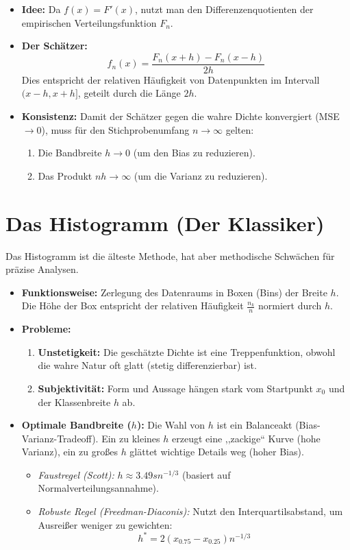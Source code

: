\documentclass[a4paper, 11pt]{scrartcl}
\begin{document}
\begin{itemize}
	\item \textbf{Idee:} Da $f(x) = F'(x)$, nutzt man den Differenzenquotienten der empirischen Verteilungsfunktion $F_n$.
	\item \textbf{Der Schätzer:}
	      \begin{equation}
	      	f_n(x) = \frac{F_n(x+h) - F_n(x-h)}{2h}
	      \end{equation}
	      Dies entspricht der relativen Häufigkeit von Datenpunkten im Intervall $(x-h, x+h]$, geteilt durch die Länge $2h$.
	\item \textbf{Konsistenz:} Damit der Schätzer gegen die wahre Dichte konvergiert (MSE $\to 0$), muss für den Stichprobenumfang $n \to \infty$ gelten:
	      \begin{enumerate}
	      	\item Die Bandbreite $h \to 0$ (um den Bias zu reduzieren).
	      	\item Das Produkt $nh \to \infty$ (um die Varianz zu reduzieren).
	      \end{enumerate}
\end{itemize}
	
\section{Das Histogramm (Der Klassiker)}
Das Histogramm ist die älteste Methode, hat aber methodische Schwächen für präzise Analysen.
	
\begin{itemize}
	\item \textbf{Funktionsweise:} Zerlegung des Datenraums in Boxen (Bins) der Breite $h$. Die Höhe der Box entspricht der relativen Häufigkeit $\frac{n_k}{n}$ normiert durch $h$.
	\item \textbf{Probleme:}
	      \begin{enumerate}
	      	\item \textbf{Unstetigkeit:} Die geschätzte Dichte ist eine Treppenfunktion, obwohl die wahre Natur oft glatt (stetig differenzierbar) ist.
	      	\item \textbf{Subjektivität:} Form und Aussage hängen stark vom Startpunkt $x_0$ und der Klassenbreite $h$ ab.
	      \end{enumerate}
	\item \textbf{Optimale Bandbreite ($h$):} Die Wahl von $h$ ist ein Balanceakt (Bias-Varianz-Tradeoff). Ein zu kleines $h$ erzeugt eine ,,zackige`` Kurve (hohe Varianz), ein zu großes $h$ glättet wichtige Details weg (hoher Bias).
	      \begin{itemize}
	      	\item \textit{Faustregel (Scott):} $h \approx 3.49 s n^{-1/3}$ (basiert auf Normalverteilungsannahme).
	      	\item \textit{Robuste Regel (Freedman-Diaconis):} Nutzt den Interquartilsabstand, um Ausreißer weniger zu gewichten:
	      	      \[ h^* = 2(x_{0.75} - x_{0.25})n^{-1/3} \]
	      \end{itemize}
\end{itemize}
	
\end{document}

